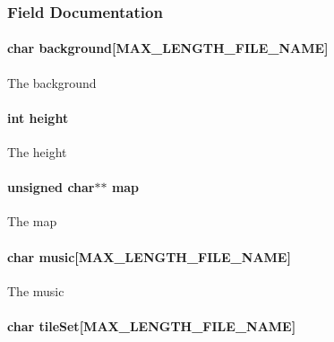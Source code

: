 \subsubsection{Field Documentation}
\hypertarget{struct_level_ad8280c14050559fbd855943575019840}{
\paragraph[{background}]{\setlength{\rightskip}{0pt plus 5cm}char background\mbox{[}{\bf M\-A\-X\-\_\-\-L\-E\-N\-G\-T\-H\-\_\-\-F\-I\-L\-E\-\_\-\-N\-A\-M\-E}\mbox{]}}}\label{struct_level_ad8280c14050559fbd855943575019840}
The background \hypertarget{struct_level_ad12fc34ce789bce6c8a05d8a17138534}{
\paragraph[{height}]{\setlength{\rightskip}{0pt plus 5cm}int height}}\label{struct_level_ad12fc34ce789bce6c8a05d8a17138534}
The height \hypertarget{struct_level_a6d985f8729c187f1c35dabba2738f0bd}{
\paragraph[{map}]{\setlength{\rightskip}{0pt plus 5cm}unsigned char$\ast$$\ast$ map}}\label{struct_level_a6d985f8729c187f1c35dabba2738f0bd}
The map \hypertarget{struct_level_a36c7c7c6b9119bc9cdf5ec62ebf49554}{
\paragraph[{music}]{\setlength{\rightskip}{0pt plus 5cm}char music\mbox{[}{\bf M\-A\-X\-\_\-\-L\-E\-N\-G\-T\-H\-\_\-\-F\-I\-L\-E\-\_\-\-N\-A\-M\-E}\mbox{]}}}\label{struct_level_a36c7c7c6b9119bc9cdf5ec62ebf49554}
The music \hypertarget{struct_level_a0e7cda756abc5c35da53272e3ca3bd47}{
\paragraph[{tile\-Set}]{\setlength{\rightskip}{0pt plus 5cm}char tile\-Set\mbox{[}{\bf M\-A\-X\-\_\-\-L\-E\-N\-G\-T\-H\-\_\-\-F\-I\-L\-E\-\_\-\-N\-A\-M\-E}\mbox{]}}}\label{struct_level_a0e7cda756abc5c35da53272e3ca3bd47}
